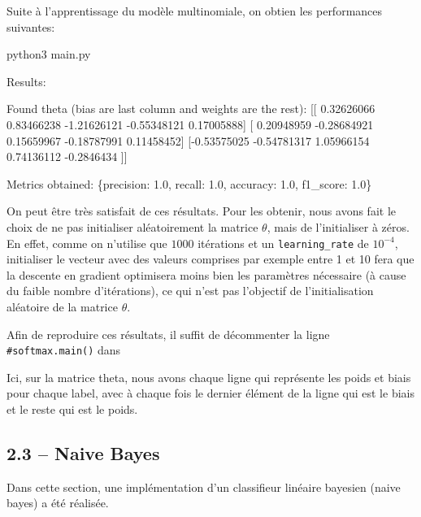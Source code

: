 \documentclass[
]{article}
\newenvironment{Shaded}{}{}
\newcommand{\NormalTok}[1]{#1}
\begin{document}
Suite à l'apprentissage du modèle multinomiale, on obtien les
performances suivantes:

\begin{Shaded}
\begin{Highlighting}[]
\NormalTok{python3 main.py}

\NormalTok{Results:}

\NormalTok{Found theta (bias are last column and weights are the rest):}
\NormalTok{[[ 0.32626066  0.83466238 {-}1.21626121 {-}0.55348121  0.17005888]}
\NormalTok{ [ 0.20948959 {-}0.28684921  0.15659967 {-}0.18787991  0.11458452]}
\NormalTok{ [{-}0.53575025 {-}0.54781317  1.05966154  0.74136112 {-}0.2846434 ]]}


\NormalTok{Metrics obtained:}
\NormalTok{\{\textquotesingle{}precision\textquotesingle{}: 1.0, \textquotesingle{}recall\textquotesingle{}: 1.0, \textquotesingle{}accuracy\textquotesingle{}: 1.0, \textquotesingle{}f1\_score\textquotesingle{}: 1.0\}}
\end{Highlighting}
\end{Shaded}

On peut être très satisfait de ces résultats. Pour les obtenir, nous
avons fait le choix de ne pas initialiser aléatoirement la matrice
\(\theta\), mais de l'initialiser à zéros. En effet, comme on n'utilise
que \(1000\) itérations et un \texttt{learning\_rate} de \(10^{-4}\),
initialiser le vecteur avec des valeurs comprises par exemple entre 1 et
10 fera que la descente en gradient optimisera moins bien les paramètres
nécessaire (à cause du faible nombre d'itérations), ce qui n'est pas
l'objectif de l'initialisation aléatoire de la matrice \(\theta\).

Afin de reproduire ces résultats, il suffit de décommenter la ligne
\texttt{\#softmax.main()} dans 

Ici, sur la matrice theta, nous avons chaque ligne qui représente les
poids et biais pour chaque label, avec à chaque fois le dernier élément
de la ligne qui est le biais et le reste qui est le poids.

\newpage{}

\hypertarget{naive-bayes-1}{%
\subsection{2.3 -- Naive Bayes}\label{naive-bayes-1}}

Dans cette section, une implémentation d'un classifieur linéaire
bayesien (naive bayes) a été réalisée.
\end{document}
